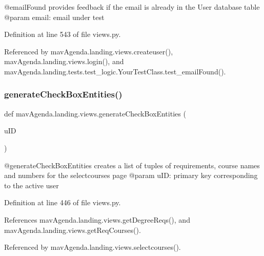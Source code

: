 \begin{DoxyVerb}@emailFound provides feedback if the email is already in the User database table
@param email: email under test
\end{DoxyVerb}
 

Definition at line 543 of file views.\+py.



Referenced by mav\+Agenda.\+landing.\+views.\+createuser(), mav\+Agenda.\+landing.\+views.\+login(), and mav\+Agenda.\+landing.\+tests.\+test\+\_\+logic.\+Your\+Test\+Class.\+test\+\_\+email\+Found().

\mbox{\label{namespacemavAgenda_1_1landing_1_1views_a877af026df9866f8e1a7a106ea9809d2}} 
\subsubsection{\texorpdfstring{generate\+Check\+Box\+Entities()}{generateCheckBoxEntities()}}
{\footnotesize\ttfamily def mav\+Agenda.\+landing.\+views.\+generate\+Check\+Box\+Entities (\begin{DoxyParamCaption}\item[{}]{u\+ID }\end{DoxyParamCaption})}

\begin{DoxyVerb}@generateCheckBoxEntities creates a list of tuples of requirements, course names and numbers for the selectcourses page
@param uID: primary key corresponding to the active user
\end{DoxyVerb}
 

Definition at line 446 of file views.\+py.



References mav\+Agenda.\+landing.\+views.\+get\+Degree\+Reqs(), and mav\+Agenda.\+landing.\+views.\+get\+Req\+Courses().



Referenced by mav\+Agenda.\+landing.\+views.\+selectcourses().

\mbox{\label{namespacemavAgenda_1_1landing_1_1views_a5a6480f4f25fb397610881b3e96e20a7}} 
